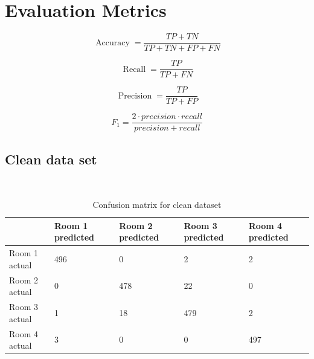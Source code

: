\documentclass[a4paper, 11pt]{article}
\begin{document}
\pagebreak
\section{Evaluation Metrics}

    \[ \ensuremath{\operatorname{Accuracy}} = \frac{\mathit{TP} +
   \mathit{TN}}{\mathit{TP} + \mathit{TN} +
   \mathit{FP} + \mathit{FN}} \]

   \[ \ensuremath{\operatorname{Recall}} = \frac{\mathit{TP}}{\mathit{TP} +
   \mathit{FN}} \]

   \[ \ensuremath{\operatorname{Precision}} = \frac{\mathit{TP}}{\mathit{TP} +
   \mathit{FP}} \]

   \[ F_1 = \frac{2 \cdot \mathit{precision} \cdot \mathit{recall}}{\mathit{precision} + \mathit{recall}} \]

    \subsection{Clean data set}
    \renewcommand{\arraystretch}{2}
    \begin{table}[htb]
      \centering
      \caption{Confusion matrix for clean dataset} \
      \begin{tabular}{|l|l|l|l|l|}
      \hline
                    & Room 1 predicted & Room 2 predicted & Room 3 predicted & Room 4 predicted \\ \hline
      Room 1 actual & 496              & 0                & 2                & 2                \\ \hline
      Room 2 actual & 0                & 478              & 22               & 0                \\ \hline
      Room 3 actual & 1                & 18               & 479              & 2                \\ \hline
      Room 4 actual & 3                & 0                & 0                & 497              \\ \hline
      \end{tabular}
    \end{table}
\end{document}
